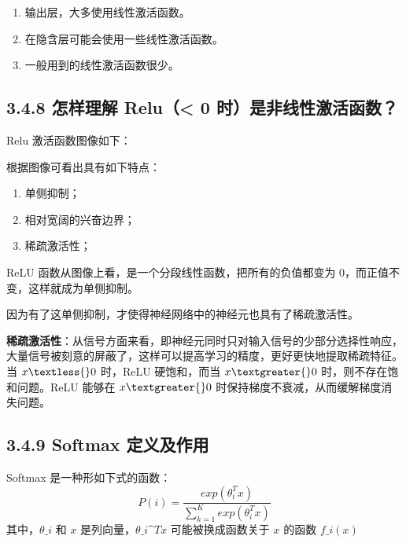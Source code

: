 \begin{enumerate}
\def\labelenumi{\arabic{enumi}.}
 
\item
  输出层，大多使用线性激活函数。
\item
  在隐含层可能会使用一些线性激活函数。
\item
  一般用到的线性激活函数很少。
\end{enumerate}

\subsection{3.4.8 怎样理解 Relu（\textless{} 0
时）是非线性激活函数？}\label{ux600eux6837ux7406ux89e3-relu-0-ux65f6ux662fux975eux7ebfux6027ux6fc0ux6d3bux51fdux6570}

Relu 激活函数图像如下：

 

根据图像可看出具有如下特点：

\begin{enumerate}
\def\labelenumi{\arabic{enumi}.}
\item
  单侧抑制；
\item
  相对宽阔的兴奋边界；
\item
  稀疏激活性；
\end{enumerate}

ReLU 函数从图像上看，是一个分段线性函数，把所有的负值都变为
0，而正值不变，这样就成为单侧抑制。

因为有了这单侧抑制，才使得神经网络中的神经元也具有了稀疏激活性。

\textbf{稀疏激活性}：从信号方面来看，即神经元同时只对输入信号的少部分选择性响应，大量信号被刻意的屏蔽了，这样可以提高学习的精度，更好更快地提取稀疏特征。当
$ x\textless{}0 $ 时，ReLU 硬饱和，而当 $ x\textgreater{}0 $
时，则不存在饱和问题。ReLU 能够在 $ x\textgreater{}0 $
时保持梯度不衰减，从而缓解梯度消失问题。

\subsection{3.4.9 Softmax
定义及作用}\label{softmax-ux5b9aux4e49ux53caux4f5cux7528}

Softmax 是一种形如下式的函数： \[
P(i) = \frac{exp(\theta_i^T x)}{\sum_{k=1}^{K} exp(\theta_i^T x)}
\] ​ 其中，$ \theta\_i $ 和 $ x $ 是列向量，$ \theta\_i\^{}T x $
可能被换成函数关于 $ x $ 的函数 $ f\_i(x) $

